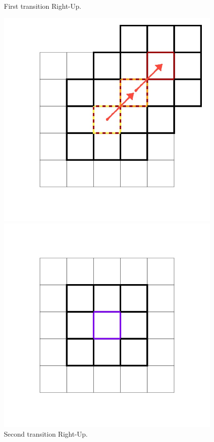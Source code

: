 \documentclass[class=article, crop=false]{standalone}
\begin{document}
\begin{figure}[ht]
\begin{minipage}[c]{0.33\linewidth}
\captionsetup{width=.8\linewidth}
\caption{First transition Right-Up.}
\label{fig:Thesis_D2Q9andQ9.002}
\end{minipage}
\begin{minipage}[c]{0.33\linewidth}
\centering

\includegraphics[scale=0.17]{draw/Thesis_plots/Thesis_D2Q9andQ9_crop/Thesis_D2Q9andQ9.003}

\captionsetup{width=.8\linewidth}
\caption{Second transition Right-Up.}
\label{fig:Thesis_D2Q9andQ9.003}
\end{minipage}


\begin{minipage}[c]{0.33\linewidth}
\centering

\includegraphics[scale=0.17]{draw/Thesis_plots/Thesis_D2Q9andQ9_crop/Thesis_D2Q9andQ9.005}


\end{minipage}
\end{figure}
\end{document}
